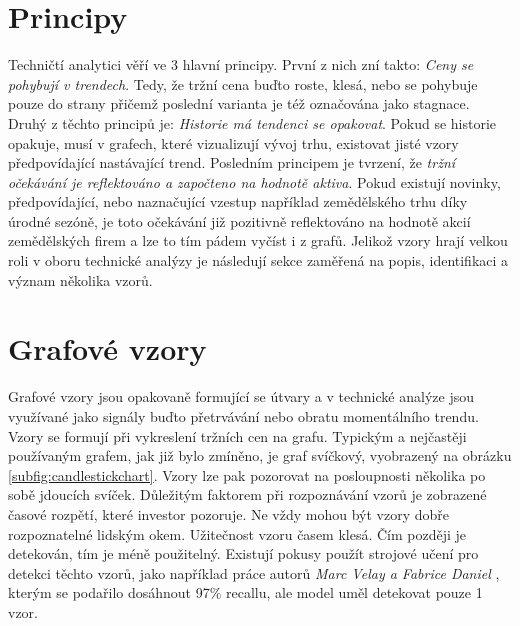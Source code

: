 \section{Principy}
Techničtí analytici věří ve 3 hlavní principy. První z nich zní takto: \emph{Ceny se pohybují v trendech}. Tedy, že tržní cena buďto roste, klesá, nebo se pohybuje
pouze do strany přičemž poslední varianta je též označována jako stagnace. Druhý z těchto principů je: \emph{Historie má tendenci se opakovat}. Pokud se historie
opakuje, musí v grafech, které vizualizují vývoj trhu, existovat jisté vzory předpovídající nastávající trend. Posledním principem je tvrzení, že \emph{tržní očekávání
    je reflektováno a započteno na hodnotě aktiva}. Pokud existují novinky, předpovídající, nebo naznačující vzestup například zemědělského trhu díky úrodné sezóně, je toto
očekávání již pozitivně reflektováno na hodnotě akcií zemědělských firem a lze to tím pádem vyčíst i z grafů. Jelikož vzory hrají velkou roli v oboru technické analýzy
je následují sekce zaměřená na popis, identifikaci a význam několika vzorů.


\section{Grafové vzory}
\label{sec:ChartPatterns}
Grafové vzory jsou opakovaně formující se útvary a v technické analýze jsou využívané jako signály buďto přetrvávání nebo obratu momentálního trendu. Vzory se formují při vykreslení
tržních cen na grafu. Typickým a nejčastěji používaným grafem, jak již bylo zmíněno, je graf svíčkový, vyobrazený na obrázku \ref{subfig:candlestickchart}.
Vzory lze pak
pozorovat na posloupnosti několika po sobě jdoucích svíček. Důležitým faktorem při rozpoznávání vzorů je zobrazené časové rozpětí, které investor pozoruje. Ne vždy mohou
být vzory dobře rozpoznatelné lidským okem. Užitečnost vzoru časem klesá. Čím později je detekován, tím je méně použitelný.
Existují pokusy \cite{pattern-recognition-using-decision-trees} použít strojové učení pro detekci těchto vzorů, jako například práce
autorů \emph{Marc Velay a Fabrice Daniel} \cite{pattern-recognition-using-ai}, kterým
se podařilo dosáhnout 97\% recallu, ale model uměl detekovat pouze 1 vzor.


